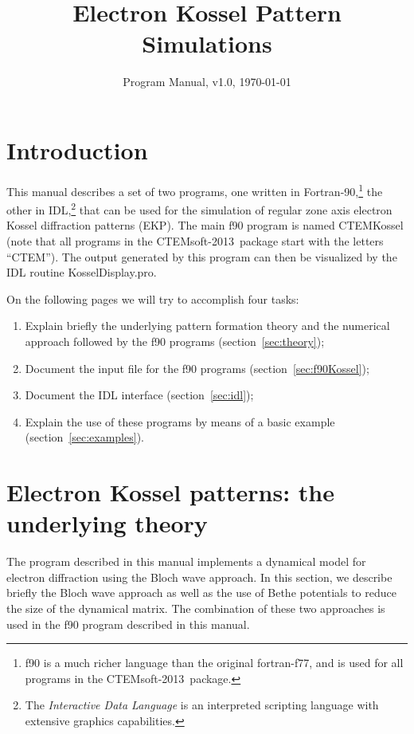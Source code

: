\documentclass[DIV=calc, paper=letter, fontsize=11pt]{scrartcl}	 %
\title{Electron Kossel Pattern Simulations} %
\author{\vspace*{-0.7in}} %
\date{Program Manual, v1.0, \today}
\newcommand{\ctp}{\textsf{CTEMsoft-2013}}
\begin{document}
\maketitle

\begin{figure*}[h]
\leavevmode\centering
{}
\end{figure*}

\renewcommand{\contentsname}{Table of Contents}
{\small\tableofcontents}

\newpage
\section{Introduction}
This manual describes a set of two programs, 
one written in Fortran-90,\footnote{f90 is a much richer language than the original fortran-f77, and is
used for all programs in the \ctp\ package.} 
the other in IDL,\footnote{The \textit{Interactive Data Language} is an interpreted scripting language with extensive graphics capabilities.} 
that can be used for the simulation of regular zone axis electron Kossel diffraction patterns (EKP).  The main f90 program
is named \textsf{CTEMKossel} (note that all programs in the \ctp\ package start with the letters ``CTEM'').
The output generated by this program can then be visualized by the IDL routine \textsf{KosselDisplay.pro}.  

On the following pages we will try to accomplish four tasks:
\begin{enumerate}
	\item Explain briefly the underlying pattern formation theory and the numerical approach followed by the f90 programs (section~\ref{sec:theory});
	\item Document the input file for the f90 programs (section~\ref{sec:f90Kossel});
	\item Document the IDL interface (section~\ref{sec:idl});
	\item Explain the use of these programs by means of a basic example (section~\ref{sec:examples}).
\end{enumerate}



\newpage
\section{Electron Kossel patterns: the underlying theory\label{sec:theory}}
The program described in this manual implements a dynamical model for electron diffraction using the 
Bloch wave approach.  In this section, we describe briefly the Bloch wave approach as well as the 
use of Bethe potentials to reduce the size of the dynamical matrix.  The combination of these 
two approaches is used in the f90 program described in this manual.
\end{document}
